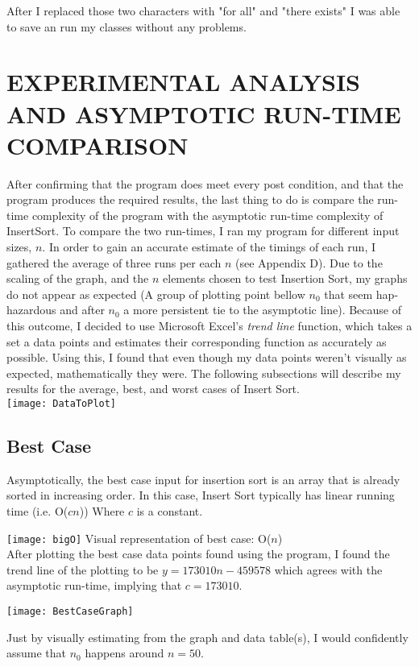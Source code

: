\documentclass[12pt]{article}
\begin{document}
After I replaced those two characters with "for all" and "there exists" I was able to save an run my classes without any problems.


\section*{EXPERIMENTAL ANALYSIS AND ASYMPTOTIC RUN-TIME COMPARISON}
After confirming that the program does meet every post condition, and that the program produces the required results, the last thing to do is compare the run-time complexity of the program with the asymptotic run-time complexity of InsertSort. To compare the two run-times, I ran my program for different input sizes, $n$. In order to gain an accurate estimate of the timings of each run, I gathered the average of three runs per each $n$ (see Appendix D). Due to the scaling of the graph, and the $n$ elements chosen to test Insertion Sort, my graphs do not appear as expected (A group of plotting point bellow $n_0$ that seem hap-hazardous and after $n_0$ a more persistent tie to the asymptotic line). Because of this outcome, I decided to use Microsoft Excel's \textit{trend line} function, which takes a set a data points and estimates their corresponding function as accurately as possible. Using this,  I found that even though my data points weren't visually as expected, mathematically they were. The following subsections will describe my results for the average, best, and worst cases of Insert Sort.\\

\texttt{[image: DataToPlot]}

\subsection*{Best Case}
Asymptotically, the best case input for insertion sort is an array that is already sorted in increasing order. In this case, Insert Sort typically has linear running time (i.e. O($cn$)) Where $c$ is a constant.  

\texttt{[image: bigO]}
Visual representation of best case: O($n$)\\

After plotting the best case data points found using the program, I found the trend line of the plotting to be $y=173010n-459578$ which agrees with the asymptotic run-time, implying that $c = 173010$. 

\texttt{[image: BestCaseGraph]}

 Just by visually estimating from the graph and data table(s), I would confidently assume that $n_0$ happens around $n = 50$.
\end{document}
